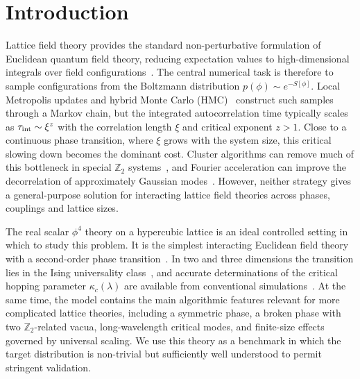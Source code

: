 \documentclass[reprint,twocolumn,superscriptaddress,preprintnumbers,amsmath,amssymb,aps,prd,floatfix]{revtex4-2}
\begin{document}
\maketitle

\section{Introduction}

Lattice field theory provides the standard non-perturbative formulation of Euclidean quantum field theory, reducing expectation values to high-dimensional integrals over field configurations~\cite{Montvay:1994cy,Smit:2002ug}. The central numerical task is therefore to sample configurations from the Boltzmann distribution
$p(\phi)\sim e^{-S[\phi]}$.
Local Metropolis updates and hybrid Monte Carlo (HMC)~\cite{Duane:1987de} construct such samples through a Markov chain, but the integrated autocorrelation time typically scales as $\tau_{\rm int}\sim \xi^z$ with the correlation length $\xi$ and critical exponent $z>1$. Close to a continuous phase transition, where $\xi$ grows with the system size, this critical slowing down becomes the dominant cost. Cluster algorithms can remove much of this bottleneck in special $\mathbb{Z}_2$ systems~\cite{Swendsen:1987ce,Wolff:1988uh}, and Fourier acceleration can improve the decorrelation of approximately Gaussian modes~\cite{Davies:1987vs}. However, neither strategy gives a general-purpose solution for interacting lattice field theories across phases, couplings and lattice sizes.

The real scalar $\phi^4$ theory on a hypercubic lattice is an ideal controlled setting in which to study this problem. It is the simplest interacting Euclidean field theory with a second-order phase transition~\cite{Luscher:1988uq,Montvay:1994cy}. In two and three dimensions the transition lies in the Ising universality class~\cite{Pelissetto:2000ek}, and accurate determinations of the critical hopping parameter $\kappa_c(\lambda)$ are available from conventional simulations~\cite{Schaich:2009jk,Wozar:2011gu}. At the same time, the model contains the main algorithmic features relevant for more complicated lattice theories, including a symmetric phase, a broken phase with two $\mathbb{Z}_2$-related vacua, long-wavelength critical modes, and finite-size effects governed by universal scaling. We use this theory as a benchmark in which the target distribution is non-trivial but sufficiently well understood to permit stringent validation.
\end{document}
